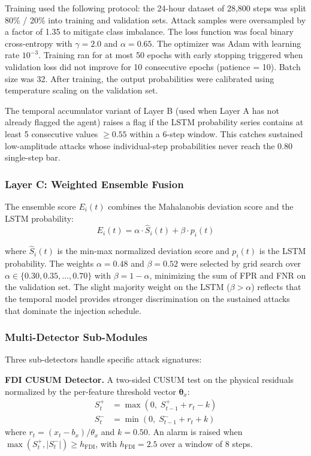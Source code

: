 Training used the following protocol: the 24-hour dataset of 28,800 steps was split 80\% / 20\%
into training and validation sets. Attack samples were oversampled by a factor of 1.35 to mitigate
class imbalance. The loss function was focal binary cross-entropy with $\gamma = 2.0$ and
$\alpha = 0.65$. The optimizer was Adam with learning rate $10^{-3}$. Training ran for at most
50 epochs with early stopping triggered when validation loss did not improve for 10 consecutive
epochs (patience = 10). Batch size was 32. After training, the output probabilities were calibrated
using temperature scaling on the validation set.

The temporal accumulator variant of Layer B (used when Layer A has not already flagged the agent)
raises a flag if the LSTM probability series contains at least 5 consecutive values $\geq 0.55$
within a 6-step window. This catches sustained low-amplitude attacks whose individual-step
probabilities never reach the 0.80 single-step bar.

\subsubsection{Layer C: Weighted Ensemble Fusion}
\label{sec:layerc}

The ensemble score $E_i(t)$ combines the Mahalanobis deviation score and the LSTM probability:
\begin{equation}
E_i(t) = \alpha \cdot \hat{S}_i(t) + \beta \cdot p_i(t)
\label{eq:ensemble}
\end{equation}

where $\hat{S}_i(t)$ is the min-max normalized deviation score and $p_i(t)$ is the LSTM
probability. The weights $\alpha = 0.48$ and $\beta = 0.52$ were selected by grid search over
$\alpha \in \{0.30, 0.35, \ldots, 0.70\}$ with $\beta = 1 - \alpha$, minimizing the sum of
FPR and FNR on the validation set. The slight majority weight on the LSTM ($\beta > \alpha$)
reflects that the temporal model provides stronger discrimination on the sustained attacks that
dominate the injection schedule.

\subsubsection{Multi-Detector Sub-Modules}
\label{sec:subdets}

Three sub-detectors handle specific attack signatures:

\textbf{FDI CUSUM Detector.} A two-sided CUSUM test on the physical residuals normalized by the
per-feature threshold vector $\boldsymbol{\theta}_x$:
\begin{align}
S^+_t &= \max(0,\; S^+_{t-1} + r_t - k) \\
S^-_t &= \min(0,\; S^-_{t-1} + r_t + k)
\end{align}
where $r_t = (x_t - b_x) / \theta_x$ and $k = 0.50$. An alarm is raised when
$\max(S^+_t, |S^-_t|) \geq h_{\text{FDI}}$, with $h_{\text{FDI}} = 2.5$ over a window of 8 steps.

